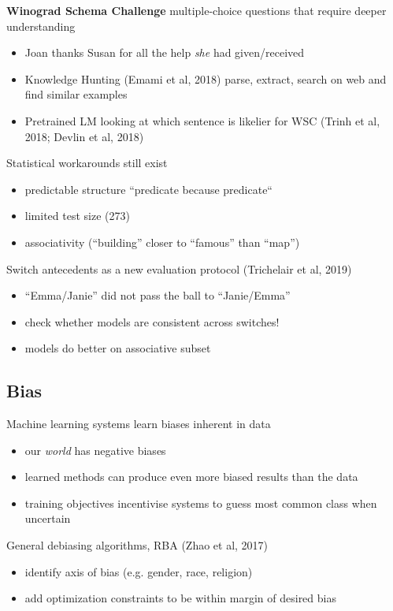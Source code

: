 \documentclass[]{article}
\theoremstyle{definition}
\begin{document}
\textbf{Winograd Schema Challenge} multiple-choice questions that require deeper understanding
\begin{itemize}
    \item Joan thanks Susan for all the help \textit{she} had given/received
    \item Knowledge Hunting (Emami et al, 2018) parse, extract, search on web and find similar examples
    \item Pretrained LM looking at which sentence is likelier for WSC (Trinh et al, 2018; Devlin et al, 2018)
\end{itemize}

Statistical workarounds still exist
\begin{itemize}
    \item predictable structure ``predicate because predicate``
    \item limited test size (273)
    \item associativity (``building'' closer to ``famous'' than ``map'')
\end{itemize}

Switch antecedents as a new evaluation protocol (Trichelair et al, 2019)
\begin{itemize}
    \item ``Emma/Janie'' did not pass the ball to ``Janie/Emma''
    \item check whether models are consistent across switches!
    \item models do better on associative subset
\end{itemize}

\subsection{Bias}%
\label{sub:bias}

Machine learning systems learn biases inherent in data
\begin{itemize}
    \item our \textit{world} has negative biases
    \item learned methods can produce even more biased results than the data
    \item training objectives incentivise systems to guess most common class when uncertain
\end{itemize}

General debiasing algorithms, RBA (Zhao et al, 2017)
\begin{itemize}
    \item identify axis of bias (e.g. gender, race, religion)
    \item add optimization constraints to be within margin of desired bias
\end{itemize}
\end{document}
